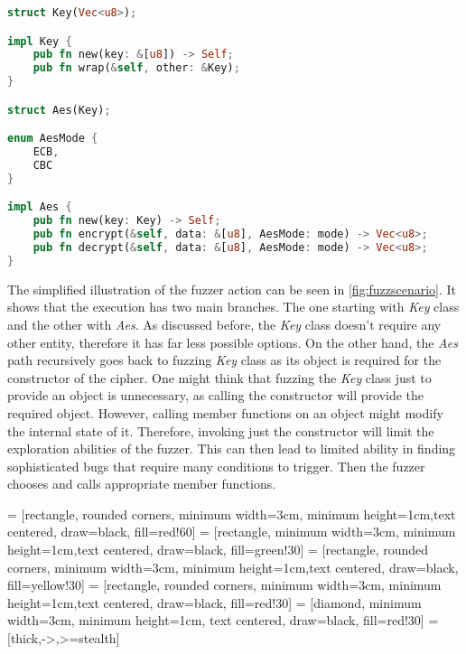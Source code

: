 \begin{minipage}{\linewidth}
\begin{lstlisting}[language=rust,caption={Target API example.},label={lst:extarget}]
struct Key(Vec<u8>);

impl Key {
    pub fn new(key: &[u8]) -> Self;
    pub fn wrap(&self, other: &Key);
}

struct Aes(Key);

enum AesMode {
    ECB,
    CBC
}

impl Aes {
    pub fn new(key: Key) -> Self;
    pub fn encrypt(&self, data: &[u8], AesMode: mode) -> Vec<u8>;
    pub fn decrypt(&self, data: &[u8], AesMode: mode) -> Vec<u8>;
}
\end{lstlisting}
\end{minipage}

The simplified illustration of the fuzzer action can be seen in \ref{fig:fuzzscenario}. It shows that the execution has two main branches. The one starting with \textit{Key} class and the other with \textit{Aes}. As discussed before, the \textit{Key} class doesn't require any other entity, therefore it has far less possible options. On the other hand, the \textit{Aes} path recursively goes back to fuzzing \textit{Key} class as its object is required for the constructor of the cipher. One might think that fuzzing the \textit{Key} class just to provide an object is unnecessary, as calling the constructor will provide the required object. However, calling member functions on an object might modify the internal state of it. Therefore, invoking just the constructor will limit the exploration abilities of the fuzzer. This can then lead to limited ability in finding sophisticated bugs that require many conditions to trigger. Then the fuzzer chooses and calls appropriate member functions.

 = [rectangle, rounded corners, minimum width=3cm, minimum height=1cm,text centered, draw=black, fill=red!60]
 = [rectangle, minimum width=3cm, minimum height=1cm,text centered, draw=black, fill=green!30]
 = [rectangle, rounded corners, minimum width=3cm, minimum height=1cm,text centered, draw=black, fill=yellow!30]
 = [rectangle, rounded corners, minimum width=3cm, minimum height=1cm,text centered, draw=black, fill=red!30]
 = [diamond, minimum width=3cm, minimum height=1cm, text centered, draw=black, fill=red!30]
 = [thick,->,>=stealth]

